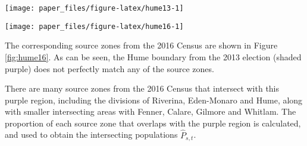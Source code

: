 \documentclass[times, doublespace]{anzsauth}
\let\origfigure\figure
\let\endorigfigure\endfigure
\renewenvironment{figure}[1][2] {
    \expandafter\origfigure\expandafter[htbp]
} {
    \endorigfigure
}
\let\origtable\table
\let\endorigtable\endtable
\renewenvironment{table}[1][2] {
    \expandafter\origtable\expandafter[htbp]
} {
    \endorigtable
}
\begin{document}
\begin{figure}[h]

{\centering \texttt{[image: paper\_files/figure-latex/hume13-1]} 

}

\caption{Some of the electoral boundaries in NSW for 2013, with the electoral boundary for Hume shown in purple.}\label{fig:hume13}
\end{figure}

\begin{figure}[h]

{\centering \texttt{[image: paper\_files/figure-latex/hume16-1]} 

}

\caption{Census division boundaries in NSW for 2016, with the 2013 electoral boundary for Hume, shown in purple. The purple region is not contained within a single Census division.}\label{fig:hume16}
\end{figure}

The corresponding source zones from the 2016 Census are shown in Figure \ref{fig:hume16}. As can be seen, the Hume boundary from the 2013 election (shaded purple) does not perfectly match any of the source zones.

There are many source zones from the 2016 Census that intersect with this purple region, including the divisions of Riverina, Eden-Monaro and Hume, along with smaller intersecting areas with Fenner, Calare, Gilmore and Whitlam. The proportion of each source zone that overlaps with the purple region is calculated, and used to obtain the intersecting populations \(\hat{P}_{s,t}\).

\begin{table}[t]

\caption{\label{tab:hume1}Population from each intersecting Census source zone (2016) that is allocated to the target zone (purple region - Hume electoral boundary in 2013), and the corresponding proportion of Australian citizens in each of these source zones.}
\centering
{}
\end{table}
\end{document}

